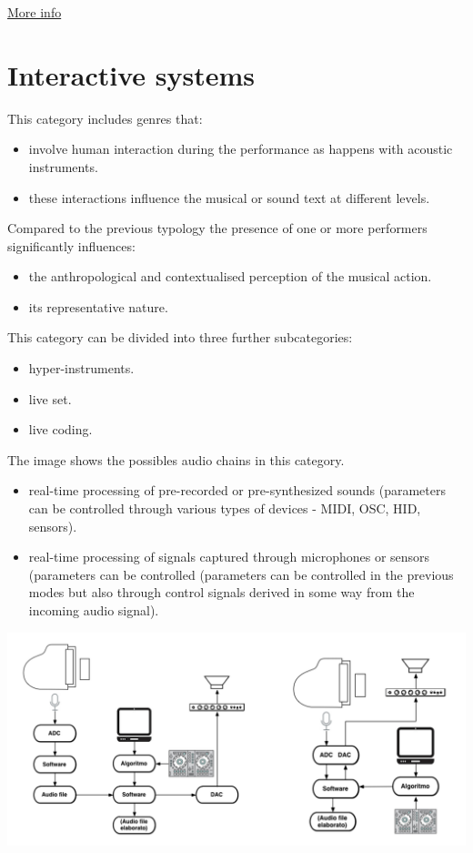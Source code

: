 \href{http://www.musicaecodice.it/gitmedia/emc/2_media/gaming.pdf}{More info}

\section{Interactive systems }\label{interactive-systems}

This category includes genres that:

\begin{itemize}
\tightlist
\item involve human interaction during the performance as happens with acoustic instruments.
\item these interactions influence the musical or sound text at different levels.
\end{itemize}

Compared to the previous typology the presence of one or more performers significantly influences:

\begin{itemize}
\tightlist
\item the anthropological and contextualised perception of the musical action.
\item its representative nature.
\end{itemize}

This category can be divided into three further subcategories:

\begin{itemize}
\tightlist
\item hyper-instruments.
\item live set.
\item live coding.
\end{itemize}

The image shows the possibles audio chains in this category.

\begin{itemize}
\tightlist
\item real-time processing of pre-recorded or pre-synthesized sounds (parameters can be controlled through various types of devices - MIDI, OSC, HID, sensors).
\item real-time processing of signals captured through microphones or sensors (parameters can be controlled (parameters can be controlled in the previous modes but also through control signals derived in some way from the incoming audio signal).
\end{itemize}

\begin{center}
\includegraphics[scale=1]{../img/chain2.png}
\end{center}

